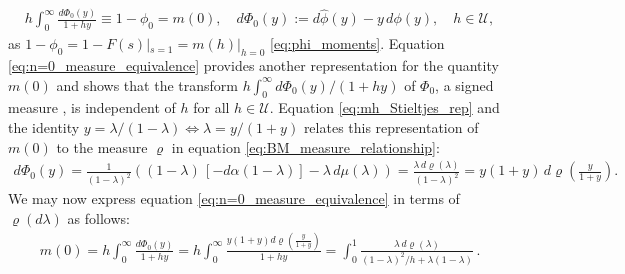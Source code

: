 \documentclass[english,12pt,jmp,graphicx]{revtex4-1}
\newcommand{\ph}{\hat{\phi}}
\begin{document}
%
%
\begin{align}\label{eq:n=0_measure_equivalence}
 h \int_0^\infty\frac{d\Phi_0(y)}{1+hy}\equiv1-\phi_0=m(0),  \quad
 d\Phi_0(y):=d\ph(y)-y\,d\phi(y), \quad
 h\in\mathcal{U},
\end{align}
%
as $1-\phi_0=1-F(s)|_{s=1}=m(h)|_{h=0}$ \eqref{eq:phi_moments}. Equation
\eqref{eq:n=0_measure_equivalence} 
provides another representation for the quantity $m(0)$ and
shows that the transform $h\int_0^\infty d\Phi_0(y)/(1+hy)$ of $\Phi_0$, a signed
measure \cite{Rudin:87}, is independent of $h$ for all 
$h\in\mathcal{U}$. Equation \eqref{eq:mh_Stieltjes_rep} and the
identity $y=\lambda/(1-\lambda)\iff\lambda=y/(1+y)$ relates this representation of $m(0)$
to the measure $\varrho$ in equation \eqref{eq:BM_measure_relationship}:         
%
\begin{align*}%
  d\Phi_0(y)%
        =\frac{1}{(1-\lambda)^2}((1-\lambda)\,[-d\alpha(1-\lambda)]-\lambda\,d\mu(\lambda))
        =\frac{\lambda\,d\varrho(\lambda)}{(1-\lambda)^2}=y(1+y)\,d\varrho\left(\frac{y}{1+y}\right).%
\end{align*}
%
We may now express equation \eqref{eq:n=0_measure_equivalence}
in terms of $\varrho(d\lambda)$ as follows: 
%
\begin{align}\label{eq:n=0_measure_equivalence_rho_transform}
  m(0)= h\int_0^\infty\frac{d\Phi_0(y)}{1+hy}
      =h\int_0^\infty\frac{y(1+y)d\varrho(\frac{y}{1+y})}{1+hy}
      =\int_0^1\frac{\lambda\,d\varrho(\lambda)}{(1-\lambda)^2/h+\lambda(1-\lambda)}\,.
\end{align}
\end{document}
